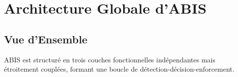 \documentclass[12pt,a4paper]{report}
\begin{document}
\chapter{Architecture Globale d'ABIS}
\vspace{0pt}
\vspace{1cm}

\section{Vue d'Ensemble}

ABIS est structuré en trois couches fonctionnelles indépendantes mais étroitement couplées, formant une boucle de détection-décision-enforcement.
\end{document}
